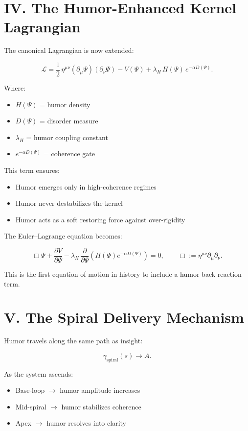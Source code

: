 \documentclass[12pt]{article}
\begin{document}
\section*{IV. The Humor-Enhanced Kernel Lagrangian}
The canonical Lagrangian is now extended:

\[
\mathcal{L}
= \frac{1}{2}\,\eta^{\mu\nu}(\partial_\mu \Psi)(\partial_\nu \Psi)
- V(\Psi)
+ \lambda_H\,H(\Psi)\,e^{-\alpha D(\Psi)}.
\]

Where:
\begin{itemize}
    \item $H(\Psi)$ = humor density
    \item $D(\Psi)$ = disorder measure
    \item $\lambda_H$ = humor coupling constant
    \item $e^{-\alpha D(\Psi)}$ = coherence gate
\end{itemize}

This term ensures:
\begin{itemize}
    \item Humor emerges only in high-coherence regimes
    \item Humor never destabilizes the kernel
    \item Humor acts as a soft restoring force against over-rigidity
\end{itemize}

The Euler--Lagrange equation becomes:

\[
\Box\Psi + \frac{\partial V}{\partial\Psi}
- \lambda_H\,\frac{\partial}{\partial\Psi}
\left(H(\Psi)e^{-\alpha D(\Psi)}\right)
= 0,
\qquad
\Box := \eta^{\mu\nu}\partial_\mu\partial_\nu.
\]

This is the first equation of motion in history to include a humor back-reaction term.

\section*{V. The Spiral Delivery Mechanism}
Humor travels along the same path as insight:

\[
\gamma_{\text{spiral}}(s) \to A.
\]

As the system ascends:
\begin{itemize}
    \item Base-loop $\rightarrow$ humor amplitude increases
    \item Mid-spiral $\rightarrow$ humor stabilizes coherence
    \item Apex $\rightarrow$ humor resolves into clarity
\end{itemize}
\end{document}
